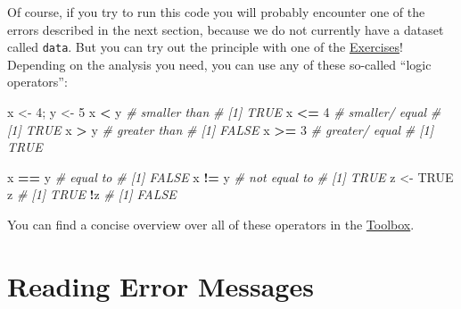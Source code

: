 \documentclass[
]{book}
\newenvironment{Shaded}{\begin{snugshade}}{\end{snugshade}}
\newcommand{\CommentTok}[1]{\textcolor[rgb]{0.56,0.35,0.01}{\textit{#1}}}
\newcommand{\ConstantTok}[1]{\textcolor[rgb]{0.56,0.35,0.01}{#1}}
\newcommand{\DecValTok}[1]{\textcolor[rgb]{0.00,0.00,0.81}{#1}}
\newcommand{\FunctionTok}[1]{\textcolor[rgb]{0.13,0.29,0.53}{\textbf{#1}}}
\newcommand{\NormalTok}[1]{#1}
\newcommand{\OtherTok}[1]{\textcolor[rgb]{0.56,0.35,0.01}{#1}}
\newcommand{\SpecialCharTok}[1]{\textcolor[rgb]{0.81,0.36,0.00}{\textbf{#1}}}
\newcommand{\StringTok}[1]{\textcolor[rgb]{0.31,0.60,0.02}{#1}}
\begin{document}
\begin{Shaded}
\end{Shaded}

Of course, if you try to run this code you will probably encounter one of the errors described in the next section, because we do not currently have a dataset called \texttt{data}.
But you can try out the principle with one of the \hyperref[exercises]{Exercises}!
Depending on the analysis you need, you can use any of these so-called ``logic operators'':

\begin{Shaded}
\begin{Highlighting}[]
\NormalTok{x }\OtherTok{\textless{}{-}} \DecValTok{4}\NormalTok{; y }\OtherTok{\textless{}{-}} \DecValTok{5}
\NormalTok{x }\SpecialCharTok{\textless{}}\NormalTok{ y }\CommentTok{\# smaller than}
\CommentTok{\# [1] TRUE}
\NormalTok{x }\SpecialCharTok{\textless{}=} \DecValTok{4} \CommentTok{\# smaller/ equal}
\CommentTok{\# [1] TRUE}
\NormalTok{x }\SpecialCharTok{\textgreater{}}\NormalTok{ y }\CommentTok{\# greater than}
\CommentTok{\# [1] FALSE}
\NormalTok{x }\SpecialCharTok{\textgreater{}=} \DecValTok{3} \CommentTok{\# greater/ equal}
\CommentTok{\# [1] TRUE}
\end{Highlighting}
\end{Shaded}

\begin{Shaded}
\begin{Highlighting}[]
\NormalTok{x }\SpecialCharTok{==}\NormalTok{ y }\CommentTok{\# equal to}
\CommentTok{\# [1] FALSE}
\NormalTok{x }\SpecialCharTok{!=}\NormalTok{ y }\CommentTok{\# not equal to}
\CommentTok{\# [1] TRUE}
\NormalTok{z }\OtherTok{\textless{}{-}} \ConstantTok{TRUE}
\NormalTok{z}
\CommentTok{\# [1] TRUE}
\SpecialCharTok{!}\NormalTok{z}
\CommentTok{\# [1] FALSE}
\end{Highlighting}
\end{Shaded}

You can find a concise overview over all of these operators in the \hyperref[toolbox]{Toolbox}.

\section{Reading Error Messages}\label{reading-error-messages}
\end{document}
